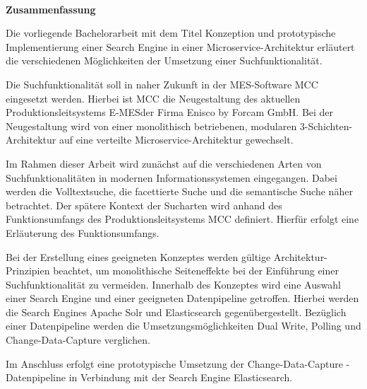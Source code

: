 
~

\vspace{17.1mm}

\begin{flushleft}
    \textbf{\huge{}Zusammenfassung}{\huge\par}
\par\end{flushleft}

Die vorliegende Bachelorarbeit mit dem Titel \glqq Konzeption und prototypische Implementierung einer Search Engine in einer Microservice-Architektur\grqq{} erläutert die verschiedenen Möglichkeiten der Umsetzung einer Suchfunktionalität. 

Die Suchfunktionalität soll in naher Zukunft in der MES-Software \glqq MCC\grqq{} eingesetzt werden. Hierbei ist \glqq MCC\grqq{} die Neugestaltung des aktuellen Produktionsleitsystems \glqq E-MES\grqq der Firma Enisco by Forcam GmbH. Bei der Neugestaltung wird von einer monolithisch betriebenen, modularen 3-Schichten-Architektur auf eine verteilte Microservice-Architektur gewechselt.

Im Rahmen dieser Arbeit wird zunächst auf die verschiedenen Arten von Suchfunktionalitäten in modernen Informationssystemen eingegangen. Dabei werden die Volltextsuche, die facettierte Suche und die semantische Suche näher betrachtet. Der spätere Kontext der Sucharten wird anhand des Funktionsumfangs des Produktionsleitsystems \glqq MCC\grqq{} definiert. Hierfür erfolgt eine Erläuterung des Funktionsumfangs.

Bei der Erstellung eines geeigneten Konzeptes werden gültige Architektur-Prinzipien beachtet, um monolithische Seiteneffekte bei der Einführung einer Suchfunktionalität zu vermeiden. Innerhalb des Konzeptes wird eine Auswahl einer Search Engine und einer geeigneten Datenpipeline getroffen. Hierbei werden die Search Engines \glqq Apache Solr\grqq{} und \glqq Elasticsearch\grqq{} gegenübergestellt. Bezüglich einer Datenpipeline werden die Umsetzungsmöglichkeiten \glqq Dual Write\grqq{}, \glqq Polling\grqq{} und \glqq Change-Data-Capture\grqq{} verglichen.

Im Anschluss erfolgt eine prototypische Umsetzung der Change-Data-Capture - Datenpipeline in Verbindung mit der Search Engine \glqq Elasticsearch\grqq{}.

